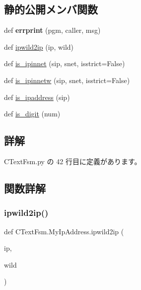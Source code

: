 \subsection*{静的公開メンバ関数}
\begin{DoxyCompactItemize}
\item 
\mbox{\label{classCTextFsm_1_1MyIpAddress_a918b0f563af505067145bc00ba7663aa}} 
def {\bfseries errprint} (pgm, caller, msg)
\item 
def \mbox{\hyperlink{classCTextFsm_1_1MyIpAddress_a84a3bcaa73683ebca8d3202734b3c98b}{ipwild2ip}} (ip, wild)
\item 
def \mbox{\hyperlink{classCTextFsm_1_1MyIpAddress_a70adbc4f3faf89e98425a1799c13b231}{is\+\_\+ipinnet}} (sip, snet, isstrict=False)
\item 
def \mbox{\hyperlink{classCTextFsm_1_1MyIpAddress_ac1dbadf1089b19f5c735e8b76e66dbc0}{is\+\_\+ipinnetw}} (sip, snet, isstrict=False)
\item 
def \mbox{\hyperlink{classCTextFsm_1_1MyIpAddress_aee7d732ce8da8657add80c4d3ec1cb0f}{is\+\_\+ipaddress}} (sip)
\item 
def \mbox{\hyperlink{classCTextFsm_1_1MyIpAddress_aa0f274c5ef3ea6e3cf86f4a58469ab51}{is\+\_\+digit}} (num)
\end{DoxyCompactItemize}


\subsection{詳解}


 C\+Text\+Fsm.\+py の 42 行目に定義があります。



\subsection{関数詳解}
\mbox{\label{classCTextFsm_1_1MyIpAddress_a84a3bcaa73683ebca8d3202734b3c98b}} 
\subsubsection{\texorpdfstring{ipwild2ip()}{ipwild2ip()}}
{\footnotesize\ttfamily def C\+Text\+Fsm.\+My\+Ip\+Address.\+ipwild2ip (\begin{DoxyParamCaption}\item[{}]{ip,  }\item[{}]{wild }\end{DoxyParamCaption})\hspace{0.3cm}{\ttfamily [static]}}

